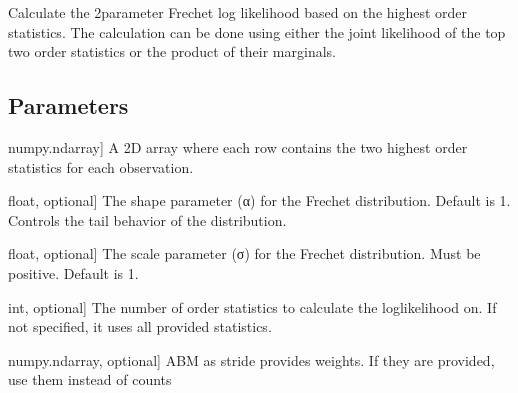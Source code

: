 \documentclass[a4paper,11pt,openany,english]{sphinxmanual}
\begin{document}

\begin{fulllineitems}
\label{\detokenize{api_topt:xtremes.topt.Frechet_log_likelihood}}
\pysigstartsignatures
{}
\pysigstopsignatures
\sphinxAtStartPar
Calculate the 2\sphinxhyphen{}parameter Frechet log likelihood based on the highest order statistics. 
The calculation can be done using either the joint likelihood of the top two order statistics or the product of their marginals.


\subsection{Parameters}
\label{\detokenize{api_topt:id86}}\begin{description}
\sphinxlineitem{high\_order\_statistics}{[}numpy.ndarray{]}
\sphinxAtStartPar
A 2D array where each row contains the two highest order statistics for each observation.

\sphinxlineitem{alpha}{[}float, optional{]}
\sphinxAtStartPar
The shape parameter (α) for the Frechet distribution. Default is 1. Controls the tail behavior of the distribution.

\sphinxlineitem{sigma}{[}float, optional{]}
\sphinxAtStartPar
The scale parameter (σ) for the Frechet distribution. Must be positive. Default is 1.

\sphinxlineitem{r}{[}int, optional{]}
\sphinxAtStartPar
The number of order statistics to calculate the log\sphinxhyphen{}likelihood on. If not specified, it uses all provided statistics.

\sphinxlineitem{weights}{[}numpy.ndarray, optional{]}
\sphinxAtStartPar
ABM as stride provides weights. If they are provided, use them instead of counts

\end{description}



\end{fulllineitems}
\end{document}
